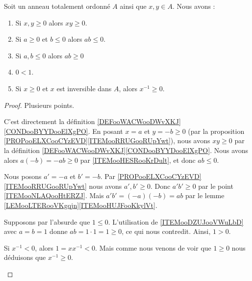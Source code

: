 \begin{lemma}        \label{LEMooXJTAooZauchx}
	Soit un anneau totalement ordonné \( A\) ainsi que \( x,y\in A\). Nous avons :
	\begin{enumerate}
		\item		\label{ITEMooHESRooKrDult}
		      Si \( x,y\geq 0\) alors \( xy\geq 0\).
		\item		\label{ITEMooNLAQooHtERZJ}
		      Si \( a\geq 0\) et \( b\leq 0\) alors \( ab\leq 0\).
		\item		\label{ITEMooDZUJooVWuLbD}
		      Si \( a,b\leq 0\) alors \( ab\geq 0\)
		\item       	\label{ITEMooRGYAooCUIfss}
		      \( 0<1\).
		\item       	\label{ITEMooMRNHooLglPKn}
		      Si \( x\geq 0\) et \( x \) est inversible dans \( A \), alors \( x^{-1}\geq 0\).
	\end{enumerate}
\end{lemma}

\begin{proof}
	Plusieurs points.
	\begin{subproof}
		C'est directement la définition \ref{DEFooWACWooDWvXKJ}\ref{CONDooBYYDooElXgPO}.
		En posant \( x = a \) et \( y=-b \geq 0\)  (par la proposition \ref{PROPooELXCooCYzEVD}\ref{ITEMooRRUGooRUpYwt}), nous avons \( xy\geq 0\) par la définition \ref{DEFooWACWooDWvXKJ}\ref{CONDooBYYDooElXgPO}. Nous avons alors \( a(-b) = -ab \geq 0\) par \ref{ITEMooHESRooKrDult}, et donc \( ab \leq 0 \).

		Nous posons \( a'=-a\) et \( b'=-b\). Par \ref{PROPooELXCooCYzEVD}\ref{ITEMooRRUGooRUpYwt} nous avons \( a',b'\geq 0\). Donc \( a'b'\geq 0\) par le point \ref{ITEMooNLAQooHtERZJ}. Mais \( a'b'=(-a)(-b)=ab\) par le lemme \ref{LEMooLTERooVKgqjn}\ref{ITEMooHUJFooKkylVt}.

		Supposons par l'absurde que \( 1\leq 0\). L'utilisation de \ref{ITEMooDZUJooVWuLbD} avec \( a = b = 1 \) donne \( ab = 1\cdot 1 = 1 \geq 0 \), ce qui nous contredit. Ainsi, \( 1> 0\).

		Si \( x^{-1}<0\), alors \( 1=xx^{-1}<0\). Mais comme nous venons de voir que \( 1\geq 0\) nous déduisons que \( x^{-1}\geq 0\).
	\end{subproof}
\end{proof}


